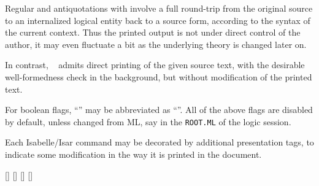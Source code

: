 \begin{isabellebody}
\begin{isamarkuptext}
\begin{description}
  Regular  and  antiquotations with  involve a full round-trip from the original source
  to an internalized logical entity back to a source form, according
  to the syntax of the current context.  Thus the printed output is
  not under direct control of the author, it may even fluctuate a bit
  as the underlying theory is changed later on.

  In contrast, \hypertarget{antiquotation option.source}{\hyperlink{antiquotation option.source}{\mbox{}}}~
  admits direct printing of the given source text, with the desirable
  well-formedness check in the background, but without modification of
  the printed text.

  \end{description}

  For boolean flags, ``'' may be abbreviated as
  ``''.  All of the above flags are disabled by default,
  unless changed from ML, say in the \verb|ROOT.ML| of the
  logic session.%
\end{isamarkuptext}%
\isamarkuptrue%
%
\isamarkuptrue%
%
\begin{isamarkuptext}%
Each Isabelle/Isar command may be decorated by additional
  presentation tags, to indicate some modification in the way it is
  printed in the document.

  \begin{railoutput}
\rail@plus
{}
[]
\rail@endplus
\rail@end
{}
[]
\rail@bar
{}[]
[]
\rail@endbar
\rail@end
\end{railoutput}



\end{isamarkuptext}
\end{isabellebody}
